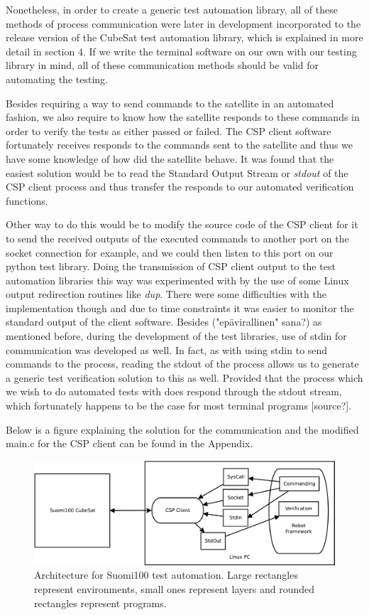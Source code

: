 \documentclass[english,12pt,a4paper,pdftex,elec,utf8]{aaltothesis}
\begin{document}
Nonetheless, in order to create a generic test automation library, all of these methods of process communication were later in development incorporated to the release version of the CubeSat test automation library, which is explained in more detail in section 4.
If we write the terminal software on our own with our testing library in mind, all of these communication methods should be valid for automating the testing.  \par 
Besides requiring a way to send commands to the satellite in an automated fashion, we also require to know how the satellite responds to these commands in order to verify the tests as either passed or failed. The CSP client software fortunately receives responds to the commands sent to the satellite and thus we have some knowledge of how did the satellite behave. It was found that the easiest solution would be to read the Standard Output Stream or \textit{stdout} of the CSP client process and thus transfer the responds to our automated verification functions.\par
Other way to do this would be to modify the source code of the CSP client for it to send the received outputs of the executed commands to another port on the socket connection for example, and we could then listen to this port on our python test library. Doing the transmission of CSP client output to the test automation libraries this way was experimented with by the use of some Linux output redirection routines like \textit{dup}. There were some difficulties with the implementation though and due to time constraints it was easier to monitor the standard output of the client software. Besides ("epävirallinen" sana?) as mentioned before, during the development of the test libraries, use of stdin for communication was developed as well. In fact, as with using stdin to send commands to the process, reading the stdout of the process allows us to generate a generic test verification solution to this as well. Provided that the process which we wish to do automated tests with does respond through the stdout stream, which fortunately happens to be the case for most terminal programs [source?].
\par   
Below is a figure explaining the solution for the communication and the modified main.c for the CSP client can be found in the Appendix.
\begin{figure}[h!]
\caption{Architecture for Suomi100 test automation. Large rectangles represent environments, small ones represent layers and rounded rectangles represent programs.}
\includegraphics[scale=0.5]{cspautomation}
\end{figure} 
\end{document}
